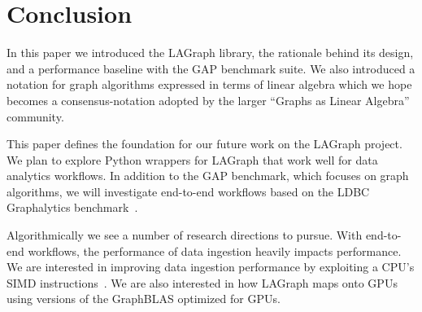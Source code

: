 \section{Conclusion}
\label{sec:conclusion}

In this paper we introduced the LAGraph library, the rationale behind its design,  
and a performance baseline with the GAP benchmark suite.   We also introduced
a notation for graph algorithms expressed in terms of linear algebra which we hope becomes
a consensus-notation adopted by the 
larger ``Graphs as Linear Algebra'' community.

This paper defines the foundation for our future work on the LAGraph project.  
We plan to explore Python wrappers for LAGraph that work well for data analytics workflows.  
In addition to the GAP benchmark, which focuses on graph algorithms, we will  
investigate end-to-end workflows based on the LDBC Graphalytics benchmark~\cite{DBLP:journals/pvldb/IosupHNHPMCCSAT16}.

Algorithmically we see a number of research directions to pursue.   With end-to-end workflows, the performance
of data ingestion heavily impacts performance.  We are interested in improving data ingestion performance
by exploiting a CPU's SIMD instructions~\cite{DBLP:journals/vldb/LangdaleL19}.  We are also interested in how  
LAGraph maps onto GPUs using versions of the GraphBLAS optimized for GPUs.